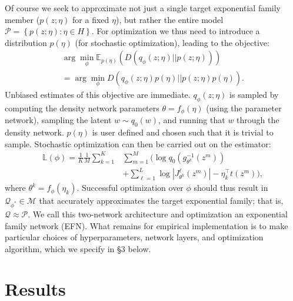 \documentclass{article}
\begin{document}
Of course we seek to approximate not just a single target exponential family member ($p(z;\eta)$ for a fixed $\eta$), but rather the entire model $\mathcal{P} = \left\{p(z;\eta): \eta \in H\right\}$.   For optimization we thus need to introduce a distribution $p(\eta)$ (for stochastic optimization), leading to the objective: 
{\small 
\begin{multline}
\!\arg\!\min_{\!\!\!\!\!\!\!\!\!\!\!\phi} \mathbb{E}_{p(\eta)} \left( D\left( q_\phi(z;\eta) || p(z;\eta) \right)\right) \\ =  \!\arg\!\min_{\!\!\!\!\!\!\!\!\!\!\!\phi}  D\left( q_\phi(z;\eta)p(\eta) || p(z;\eta)p(\eta) \right). 
\label{eq:6}
\end{multline} }
Unbiased estimates of this objective are immediate. $q_\phi(z;\eta)$ is sampled by computing the density network parameters $\theta = f_\phi(\eta)$ (using the parameter network), sampling the latent $w \sim q_0(w)$, and running that $w$ through the density network. $p(\eta)$ is user defined and chosen such that it is trivial to sample.  Stochastic optimization can then be carried out on the estimator:   
{\small 
\begin{equation}
\begin{split}
 \mathbb{L}(\phi) = \frac{1}{K}\frac{1}{M}\sum_{k=1}^K & \sum_{m=1}^M \bigg( \log q_0\left( g_{\theta^k}^{-1}\left(z^m\right)\right) \\ & + \sum_{\ell=1}^L  \log | J^\ell_{\theta^k}\left(z^m\right) | - \eta_k^\top t\left(z^m\right) \bigg),
\end{split}
\label{eq:obj}
\end{equation} }
where $\theta^k = f_\phi\left(\eta_k\right)$.  Successful optimization over $\phi$ should thus result in $\mathcal{Q}_{\phi^*} \in \mathcal{M}$ that accurately approximates the target exponential family; that is, $\mathcal{Q} \approx \mathcal{P}$.  We call this two-network architecture and optimization an exponential family network (EFN).   What remains for empirical implementation is to make particular choices of hyperparameters, network layers, and optimization algorithm, which we specify in \S3 below.

\section{Results}
\end{document}
